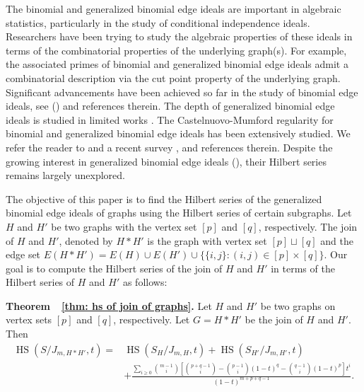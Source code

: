 \documentclass[12pt,reqno]{amsart}
\newcommand \hs{\operatorname{HS}}
\theoremstyle{plain}
\theoremstyle{definition}
\begin{document}
The binomial and generalized binomial edge ideals are important in algebraic statistics, particularly in the study of conditional independence ideals. Researchers have been trying to study the algebraic properties of these ideals in terms of the combinatorial properties of the underlying graph(s). For example, the associated primes of binomial and generalized binomial edge ideals admit a combinatorial description via the cut point property of the underlying graph. Significant advancements have been achieved so far in the study of binomial edge ideals, see (\cite{CM-BEI-Ene-H-H,OntheextremalBettinumofBEIofblockgraphds,Partial-Betti-splittings-applications-to-BEI-Jayanthan-Shivakumar-Van-tuyl,Some-CM-and-unmixed-BEI-Kiani-Madani-2015,BEI-of--generalized-block-graphs-Arvind-Kumar,HS-of-BEI-Arvind-Sarkar-2019,KK25,Krull-dim-and-reg-BEI-of-Block-graphs-Rinaldo,A-proof-for-a-conjecture-reg-BEI-Malayeri-Madani-Kiani}) and references therein. The depth of generalized binomial edge ideals is studied in limited works \cite{On-the-Depth-of-GBEI-Anuvinda-Mehta-Saha,shen-Zhu-2023-GBEI-of-complete-r-partite-graphs}. The Castelnuovo-Mumford regularity for binomial and generalized binomial edge ideals has been extensively studied. We refer the reader to \cite{On-a-reg-conjecture-of-GBEI-Anuvinda-Mehta-Saha,Castelnuovo-Mumford-reg-of-GBEI-of-graphs-Kiani-Madani-Zhu} and a recent survey \cite{jayanthan-Kumar-2025generalizedbinomialedgeideals}, and references therein. Despite the growing interest in generalized binomial edge ideals (\cite{Arithmetical-rank-and-cohomological-dimension-of-GBEI-Katsabekis,Powers-of-GBEI-of-path-graphs-shen-Zhu,GBEI-of-bipartite-graphs}), their Hilbert series remains largely unexplored.


The objective of this paper is to find the Hilbert series of the generalized binomial edge ideals of graphs using the Hilbert series of certain subgraphs. Let $H$ and $H'$ be two graphs with the vertex set $[p]$ and $[q]$, respectively. The join of $H$ and $H'$, denoted by $H*H'$ is the graph with vertex set $[p]\sqcup [q]$ and the edge set $E(H*H')=E(H)\cup E(H')\cup \{\{i,j\}:(i,j)\in [p]\times[q]\}$. Our goal is to compute the Hilbert series of the join of $H$ and $H'$ in terms of the Hilbert series of $H$ and $H'$ as follows:

 \medskip
    \noindent
    \textbf{Theorem~~\ref{thm: hs of join of graphs}.} 
 Let $H$ and $H'$ be two graphs on vertex sets $[p]$ and $[q]$, respectively. Let $G=H*H'$ be the join of $H$ and $H'$. Then 
    \begin{align*}
        \hs(S/J_{m,H*H'},t)=&\hs(S_H/J_{m,H},t)+\hs(S_{H'}/J_{m,H'},t)\\
        & +\frac{\sum_{i\geq 0}\binom{m-1}{i}\left[\binom{p+q-1}{i}-\binom{p-1}{i}(1-t)^q-\binom{q-1}{i}(1-t)^p\right]t^i}{(1-t)^{m+p+q-1}}.
    \end{align*}
\end{document}
